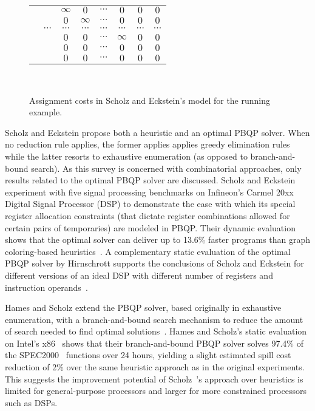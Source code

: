\documentclass[acmsmall,authorversion,nonacm]{acmart}
\begin{document}
\begin{figure}
{{\begin{tabu}{lrcccccc}
        &  & $\infty$ & $0$ & $\cdots$ & $0$ & $0$ & $0$\\
        &  & $0$ & $\infty$ & $\cdots$ & $0$ & $0$ & $0$\\
        & $\cdots$ & $\cdots$ & $\cdots$ & $\cdots$ & $\cdots$ & $\cdots$ & $\cdots$\\
        &  & $0$ & $0$ & $\cdots$ & $\infty$ & $0$ & $0$\\
        &  & $0$ & $0$ & $\cdots$ & $0$ & $0$ & $0$\\
        &  & $0$ & $0$ & $\cdots$ & $0$ & $0$ & $0$\\
      \end{tabu}
    }
    \label{fig:pbqp-example-pairs}
  }
  \hfill
  \
  \caption{Assignment costs in Scholz and Eckstein's model for the
    running example.}
  \label{fig:pbqp-example}
\end{figure}

Scholz and Eckstein propose both a heuristic and an optimal PBQP
solver.
When no reduction rule applies, the former applies applies greedy
elimination rules while the latter resorts to exhaustive enumeration
(as opposed to branch-and-bound search).
As this survey is concerned with combinatorial approaches, only
results related to the optimal PBQP solver are discussed.
Scholz and Eckstein experiment with five signal processing benchmarks
on Infineon's Carmel 20xx~\cite{Carmel} Digital Signal Processor (DSP)
to demonstrate the ease with which its special register allocation
constraints (that dictate register combinations allowed for certain
pairs of temporaries) are modeled in PBQP.
Their dynamic evaluation shows that the optimal solver can deliver up
to 13.6\% faster programs than graph coloring-based
heuristics~\cite{Smith2004}.
A complementary static evaluation of the optimal PBQP solver by
Hirnschrott \etal{} supports the conclusions of Scholz and Eckstein
for different versions of an ideal DSP with different number of
registers and instruction operands~\cite{Hirnschrott2003}.

Hames and Scholz extend the PBQP solver, based originally in
exhaustive enumeration, with a branch-and-bound search mechanism to
reduce the amount of search needed to find optimal
solutions~\cite{Hames2006}.
Hames and Scholz's static evaluation on Intel's x86~\cite{x86} shows
that their branch-and-bound PBQP solver solves 97.4\% of the
SPEC2000~\cite{CPU} functions over 24 hours, yielding a slight
estimated spill cost reduction of 2\% over the same heuristic approach
as in the original experiments.
This suggests the improvement potential of Scholz~\etal{}'s approach
over heuristics is limited for general-purpose processors and larger
for more constrained processors such as DSPs.
\end{document}
